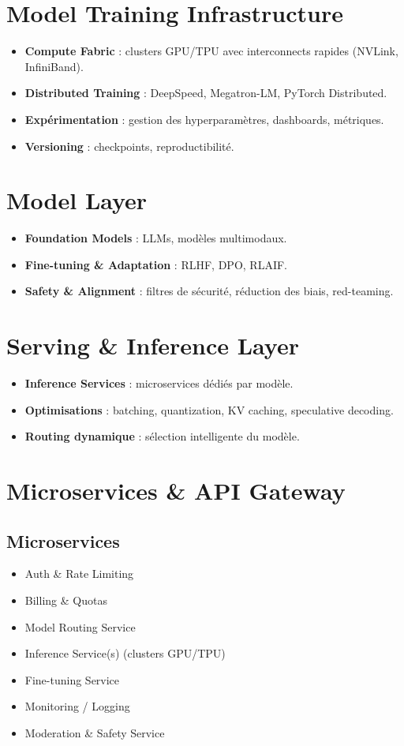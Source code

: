 \documentclass[12pt,a4paper]{report}
\begin{document}
\chapter{Model Training Infrastructure}
\begin{itemize}
    \item \textbf{Compute Fabric} : clusters GPU/TPU avec interconnects rapides (NVLink, InfiniBand).  
    \item \textbf{Distributed Training} : DeepSpeed, Megatron-LM, PyTorch Distributed.  
    \item \textbf{Expérimentation} : gestion des hyperparamètres, dashboards, métriques.  
    \item \textbf{Versioning} : checkpoints, reproductibilité.  
\end{itemize}

\chapter{Model Layer}
\begin{itemize}
    \item \textbf{Foundation Models} : LLMs, modèles multimodaux.  
    \item \textbf{Fine-tuning \& Adaptation} : RLHF, DPO, RLAIF.  
    \item \textbf{Safety \& Alignment} : filtres de sécurité, réduction des biais, red-teaming.  
\end{itemize}

\chapter{Serving \& Inference Layer}
\begin{itemize}
    \item \textbf{Inference Services} : microservices dédiés par modèle.  
    \item \textbf{Optimisations} : batching, quantization, KV caching, speculative decoding.  
    \item \textbf{Routing dynamique} : sélection intelligente du modèle.  
\end{itemize}

\chapter{Microservices \& API Gateway}
\section{Microservices}
\begin{itemize}
    \item Auth \& Rate Limiting  
    \item Billing \& Quotas  
    \item Model Routing Service  
    \item Inference Service(s) (clusters GPU/TPU)  
    \item Fine-tuning Service  
    \item Monitoring / Logging  
    \item Moderation \& Safety Service  
\end{itemize}
\end{document}
